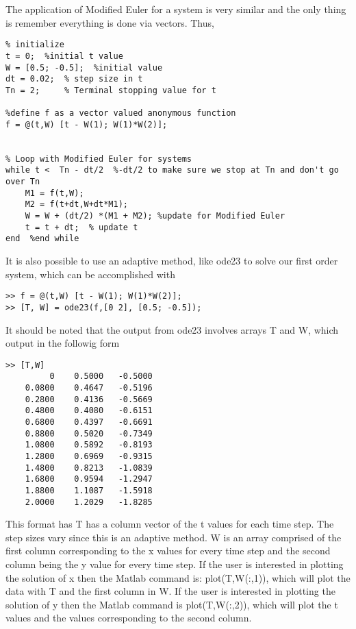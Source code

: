 \documentclass[twoside]{article}
\begin{document}
The application of Modified Euler for a system is very similar and the only thing is remember everything is done via vectors. Thus,
\begin{verbatim}
% initialize
t = 0;  %initial t value
W = [0.5; -0.5];  %initial value
dt = 0.02;  % step size in t
Tn = 2;     % Terminal stopping value for t

%define f as a vector valued anonymous function 
f = @(t,W) [t - W(1); W(1)*W(2)]; 


% Loop with Modified Euler for systems
while t <  Tn - dt/2  %-dt/2 to make sure we stop at Tn and don't go over Tn
    M1 = f(t,W);
    M2 = f(t+dt,W+dt*M1);
    W = W + (dt/2) *(M1 + M2); %update for Modified Euler
    t = t + dt;  % update t
end  %end while
\end{verbatim}

It is also possible to use an adaptive method, like ode23 to solve our first order system, which can be accomplished with
\begin{verbatim}
>> f = @(t,W) [t - W(1); W(1)*W(2)];
>> [T, W] = ode23(f,[0 2], [0.5; -0.5]);
\end{verbatim}
It should be noted that the output from ode23 involves arrays T and W, which output in the followig form
\begin{verbatim}
>> [T,W]
         0    0.5000   -0.5000
    0.0800    0.4647   -0.5196
    0.2800    0.4136   -0.5669
    0.4800    0.4080   -0.6151
    0.6800    0.4397   -0.6691
    0.8800    0.5020   -0.7349
    1.0800    0.5892   -0.8193
    1.2800    0.6969   -0.9315
    1.4800    0.8213   -1.0839
    1.6800    0.9594   -1.2947
    1.8800    1.1087   -1.5918
    2.0000    1.2029   -1.8285
\end{verbatim}
This format has T has a column vector of the t values for each time step. The step sizes vary since this is an adaptive method. W is an array comprised of the first column corresponding to the x values for every time step and the second column being the y value for every time step. If the user is interested in plotting the solution of x then the Matlab command is: plot(T,W(:,1)), which will plot the data with T and the first column in W. If the user is interested in plotting the solution of y then the Matlab command is plot(T,W(:,2)), which will plot the t values and the values corresponding to the second column. 
\end{document}
